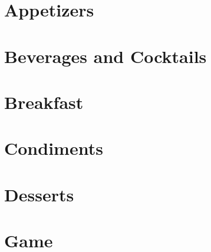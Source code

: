 \documentclass{report}
\begin{document}
    \tableofcontents

    \chapter{Appetizers}

    
    \newpage
    
    \newpage

    \chapter{Beverages and Cocktails}

    
    \newpage
    
    \newpage
    
    \newpage

    \chapter{Breakfast}

    
    \newpage
    
    \newpage
    
    \newpage
    
    \newpage

    \chapter{Condiments}

    
    \newpage
    
    \newpage
    
    \newpage
    
    \newpage

    \chapter{Desserts}

    
    \newpage
    
    \newpage
    
    \newpage
    
    \newpage

    \chapter{Game}
\end{document}
